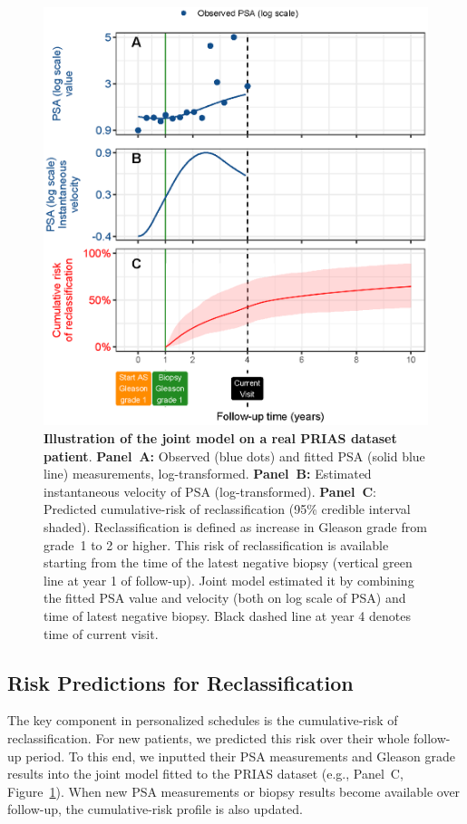 \begin{figure}
\centerline{\includegraphics[width=\columnwidth]{images/jmExplanationPlot_113.eps}}
\caption{\textbf{Illustration of the joint model on a real PRIAS dataset patient}. \textbf{Panel~A:} Observed (blue dots) and fitted PSA (solid blue line) measurements, log-transformed. \textbf{Panel~B:} Estimated instantaneous velocity of PSA (log-transformed). \textbf{Panel~C}: Predicted cumulative-risk of reclassification (95\% credible interval shaded). Reclassification is defined as increase in Gleason grade \citep{epsteinGG2014} from grade~1 to 2 or higher. This risk of reclassification is available starting from the time of the latest negative biopsy (vertical green line at year 1 of follow-up). Joint model estimated it by combining the fitted PSA value and velocity (both on log scale of PSA) and time of latest negative biopsy. Black dashed line at year 4 denotes time of current visit.}
\label{fig:jmExplanationPlot_113}
\end{figure}

\subsection{Risk Predictions for Reclassification}
The key component in personalized schedules is the cumulative-risk of reclassification. For new patients, we predicted this risk over their whole follow-up period. To this end, we inputted their PSA measurements and Gleason grade results into the joint model fitted to the PRIAS dataset (e.g., Panel~C, Figure~\ref{fig:jmExplanationPlot_113}). When new PSA measurements or biopsy results become available over follow-up, the cumulative-risk profile is also updated.

